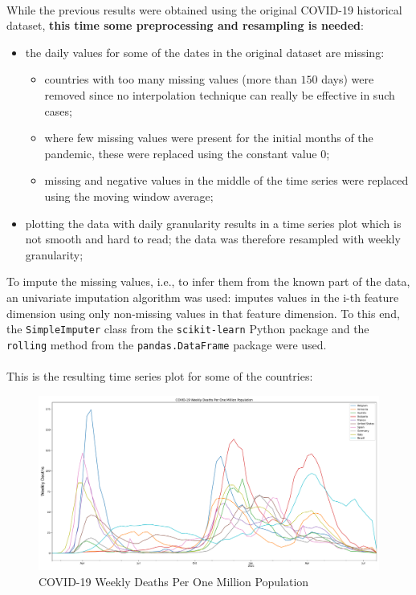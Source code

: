 \documentclass[11pt,a4paper]{article}
\begin{document}
\\
While the previous results were obtained using the original COVID-19 historical
dataset\cite{ourworldindata}, \textbf{this time some preprocessing and
resampling is needed}:
\begin{itemize}
    \item the daily values for some of the dates in the original dataset are missing:
    \begin{itemize}
        \item countries with too many missing values (more than $150$ days) were
        removed since no interpolation technique can really be effective in such
        cases;
        \item where few missing values were present for the initial months of
        the pandemic, these were replaced using the constant value $0$;
        \item missing and negative values in the middle of the time series were
        replaced using the moving window average;
    \end{itemize}
    \item plotting the data with daily granularity results in a time series plot
    which is not smooth and hard to read; the data was therefore resampled with
    weekly granularity;
\end{itemize}
To impute the missing values, i.e., to infer them from the known part of the
data, an univariate imputation algorithm was used: imputes values in the
i-th feature dimension using only non-missing values in that feature dimension.
To this end, the \texttt{SimpleImputer} class from the \texttt{scikit-learn}
Python package and the \texttt{rolling} method from the
\texttt{pandas.DataFrame} package were used.\\
\\
This is the resulting time series plot for some of the countries:
\begin{figure}[H]
    \begin{center}
        \hspace*{-0.3cm}
        \includegraphics[scale=0.325]{img/weekly-deaths-per-million.pdf}
    \end{center}
    \vspace{-0.3cm}
    \caption{COVID-19 Weekly Deaths Per One Million Population}
\end{figure}
\end{document}
